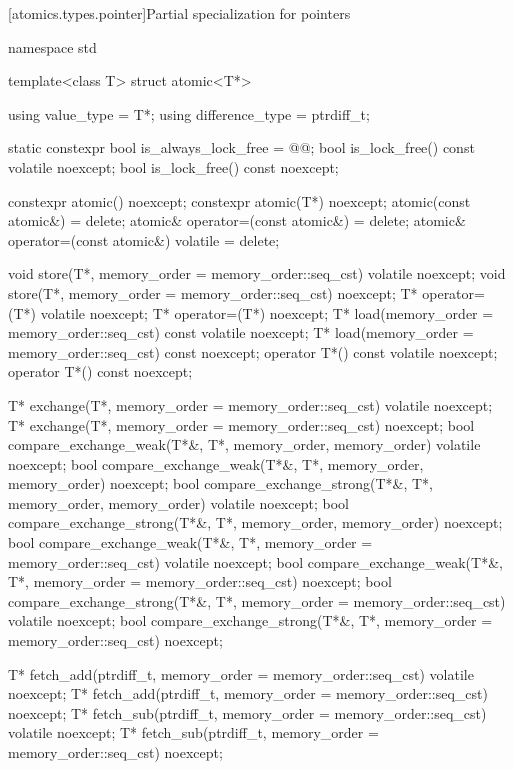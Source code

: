 [atomics.types.pointer]{Partial specialization for pointers}
%

\begin{codeblock}
namespace std {
  template<class T> struct atomic<T*> {
    using value_type = T*;
    using difference_type = ptrdiff_t;

    static constexpr bool is_always_lock_free = @@;
    bool is_lock_free() const volatile noexcept;
    bool is_lock_free() const noexcept;

    constexpr atomic() noexcept;
    constexpr atomic(T*) noexcept;
    atomic(const atomic&) = delete;
    atomic& operator=(const atomic&) = delete;
    atomic& operator=(const atomic&) volatile = delete;

    void store(T*, memory_order = memory_order::seq_cst) volatile noexcept;
    void store(T*, memory_order = memory_order::seq_cst) noexcept;
    T* operator=(T*) volatile noexcept;
    T* operator=(T*) noexcept;
    T* load(memory_order = memory_order::seq_cst) const volatile noexcept;
    T* load(memory_order = memory_order::seq_cst) const noexcept;
    operator T*() const volatile noexcept;
    operator T*() const noexcept;

    T* exchange(T*, memory_order = memory_order::seq_cst) volatile noexcept;
    T* exchange(T*, memory_order = memory_order::seq_cst) noexcept;
    bool compare_exchange_weak(T*&, T*, memory_order, memory_order) volatile noexcept;
    bool compare_exchange_weak(T*&, T*, memory_order, memory_order) noexcept;
    bool compare_exchange_strong(T*&, T*, memory_order, memory_order) volatile noexcept;
    bool compare_exchange_strong(T*&, T*, memory_order, memory_order) noexcept;
    bool compare_exchange_weak(T*&, T*,
                               memory_order = memory_order::seq_cst) volatile noexcept;
    bool compare_exchange_weak(T*&, T*,
                               memory_order = memory_order::seq_cst) noexcept;
    bool compare_exchange_strong(T*&, T*,
                                 memory_order = memory_order::seq_cst) volatile noexcept;
    bool compare_exchange_strong(T*&, T*,
                                 memory_order = memory_order::seq_cst) noexcept;

    T* fetch_add(ptrdiff_t, memory_order = memory_order::seq_cst) volatile noexcept;
    T* fetch_add(ptrdiff_t, memory_order = memory_order::seq_cst) noexcept;
    T* fetch_sub(ptrdiff_t, memory_order = memory_order::seq_cst) volatile noexcept;
    T* fetch_sub(ptrdiff_t, memory_order = memory_order::seq_cst) noexcept;

}}
\end{codeblock}
